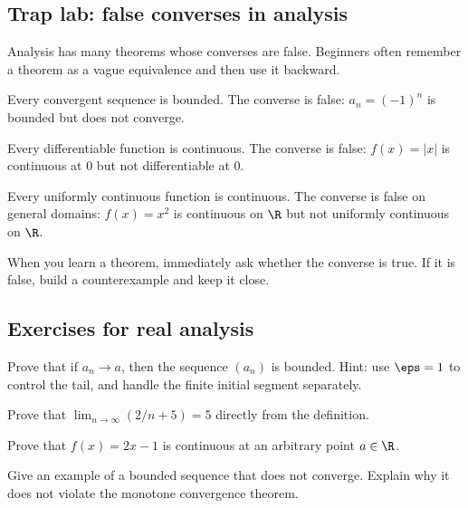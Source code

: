 \subsection{Trap lab: false converses in analysis}

Analysis has many theorems whose converses are false. Beginners often remember
a theorem as a vague equivalence and then use it backward.

\begin{example}
Every convergent sequence is bounded. The converse is false: $a_n=(-1)^n$ is
bounded but does not converge.
\end{example}

\begin{example}
Every differentiable function is continuous. The converse is false:
$f(x)=|x|$ is continuous at $0$ but not differentiable at $0$.
\end{example}

\begin{example}
Every uniformly continuous function is continuous. The converse is false on
general domains: $f(x)=x^2$ is continuous on $\R$ but not uniformly continuous
on $\R$.
\end{example}

\begin{focusbox}
When you learn a theorem, immediately ask whether the converse is true. If it is
false, build a counterexample and keep it close.
\end{focusbox}

\subsection{Exercises for real analysis}

\begin{exercise}
Prove that if $a_n\to a$, then the sequence $(a_n)$ is bounded. Hint: use
$\eps=1$ to control the tail, and handle the finite initial segment separately.
\end{exercise}

\begin{exercise}
Prove that $\lim_{n\to\infty}(2/n+5)=5$ directly from the definition.
\end{exercise}

\begin{exercise}
Prove that $f(x)=2x-1$ is continuous at an arbitrary point $a\in\R$.
\end{exercise}

\begin{exercise}
Give an example of a bounded sequence that does not converge. Explain why it
does not violate the monotone convergence theorem.
\end{exercise}

